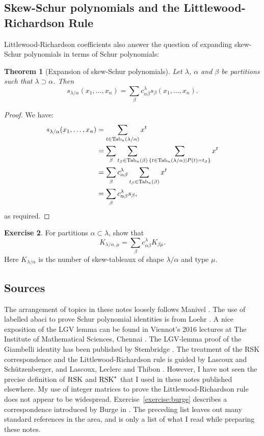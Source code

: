 \documentclass[11pt]{amsproc}
\newtheorem{theorem}{Theorem}[subsection]
\theoremstyle{definition}
\theoremstyle{example}
\newtheorem{exercise}[theorem]{Exercise}
\newcommand{\Tab}{\textup{Tab}}
\newcommand{\rsk}{\textup{RSK}}
\begin{document}
\subsection{Skew-Schur polynomials and the Littlewood-Richardson Rule}
\label{sec:skew-lr}
Littlewood-Richardson coefficients also answer the question of expanding skew-Schur polynomials in terms of Schur polynomials:
\begin{theorem}
  [Expansion of skew-Schur polynomials]
  \label{theorem:skew-exp}
  Let $\lambda$, $\alpha$ and $\beta$ be partitions such that $\lambda\supset \alpha$.
  Then
  \begin{displaymath}
    s_{\lambda/\alpha}(x_1,\dotsc,x_n) = \sum_\beta c^\lambda_{\alpha\beta}s_\beta(x_1,\dotsc,x_n).
  \end{displaymath}
\end{theorem}
\begin{proof}
  We have:
  \begin{align*}
    s_{\lambda/\alpha}(x_1,\dotsc,x_n) & = \sum_{t\in \Tab_n(\lambda/\alpha)} x^t\\
      & = \sum_\beta \sum_{t_\beta\in \Tab_n(\beta)} \sum_{\{t\in \Tab_n(\lambda/\alpha)\mid P(t)=t_\beta\}} x^t\\
      & = \sum_\beta c^\lambda_{\alpha\beta} \sum_{t_\beta\in \Tab_n(\beta)} x^t\\
      & = \sum_\beta c^\lambda_{\alpha\beta} s_\beta,
  \end{align*}
  as required.
\end{proof}
\begin{exercise}
  For partitions $\alpha\subset \lambda$, show that
  \begin{displaymath}
    K_{\lambda/\alpha,\mu} = \sum_\beta c^\lambda_{\alpha\beta} K_{\beta\mu}.
  \end{displaymath}
  Here $K_{\lambda/\alpha}$ is the number of skew-tableaux of shape $\lambda/\alpha$ and type $\mu$.
\end{exercise}
\subsection{Sources}
\label{sec:notes-literature}
The arrangement of topics in these notes loosely follows Manivel \cite{manivel}. The use of labelled abaci to prove Schur polynomial identities is from Loehr \cite{loehr}. A nice exposition of the LGV lemma can be found in Viennot's 2016 lectures at The Institute of Mathematical Sciences, Chennai \cite{imsc2016}. The LGV-lemma proof of the Giambelli identity has been published by Stembridge \cite{stembridge}. The treatment of the RSK correspondence and the Littlewood-Richardson rule is guided by Lascoux and Sch\"utzenberger\cite{ls}, and Lascoux, Leclerc and Thibon \cite{llt}. However, I have not seen the precise definition of $\rsk$ and $\rsk^*$ that I used in these notes published elsewhere. My use of integer matrices to prove the Littlewood-Richardson rule does not appear to be widespread. Exercise~\ref{exercise:burge} describes a correspondence introduced by Burge in \cite{burge}. The preceding list leaves out many standard references in the area, and is only a list of what I read while preparing these notes.
\end{document}

